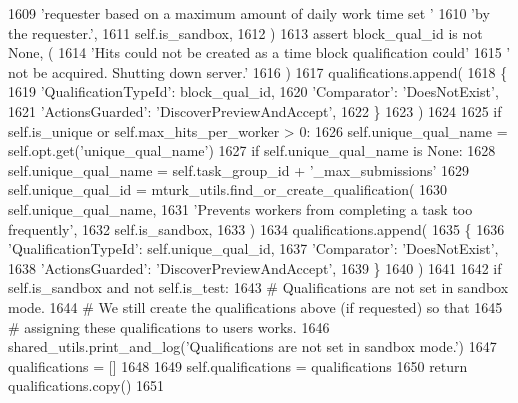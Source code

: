 \begin{DoxyCode}
1609                 \textcolor{stringliteral}{'requester based on a maximum amount of daily work time set '}
1610                 \textcolor{stringliteral}{'by the requester.'},
1611                 self.is\_sandbox,
1612             )
1613             \textcolor{keyword}{assert} block\_qual\_id \textcolor{keywordflow}{is} \textcolor{keywordflow}{not} \textcolor{keywordtype}{None}, (
1614                 \textcolor{stringliteral}{'Hits could not be created as a time block qualification could'}
1615                 \textcolor{stringliteral}{' not be acquired. Shutting down server.'}
1616             )
1617             qualifications.append(
1618                 \{
1619                     \textcolor{stringliteral}{'QualificationTypeId'}: block\_qual\_id,
1620                     \textcolor{stringliteral}{'Comparator'}: \textcolor{stringliteral}{'DoesNotExist'},
1621                     \textcolor{stringliteral}{'ActionsGuarded'}: \textcolor{stringliteral}{'DiscoverPreviewAndAccept'},
1622                 \}
1623             )
1624 
1625         \textcolor{keywordflow}{if} self.is\_unique \textcolor{keywordflow}{or} self.max\_hits\_per\_worker > 0:
1626             self.unique\_qual\_name = self.opt.get(\textcolor{stringliteral}{'unique\_qual\_name'})
1627             \textcolor{keywordflow}{if} self.unique\_qual\_name \textcolor{keywordflow}{is} \textcolor{keywordtype}{None}:
1628                 self.unique\_qual\_name = self.task\_group\_id + \textcolor{stringliteral}{'\_max\_submissions'}
1629             self.unique\_qual\_id = mturk\_utils.find\_or\_create\_qualification(
1630                 self.unique\_qual\_name,
1631                 \textcolor{stringliteral}{'Prevents workers from completing a task too frequently'},
1632                 self.is\_sandbox,
1633             )
1634             qualifications.append(
1635                 \{
1636                     \textcolor{stringliteral}{'QualificationTypeId'}: self.unique\_qual\_id,
1637                     \textcolor{stringliteral}{'Comparator'}: \textcolor{stringliteral}{'DoesNotExist'},
1638                     \textcolor{stringliteral}{'ActionsGuarded'}: \textcolor{stringliteral}{'DiscoverPreviewAndAccept'},
1639                 \}
1640             )
1641 
1642         \textcolor{keywordflow}{if} self.is\_sandbox \textcolor{keywordflow}{and} \textcolor{keywordflow}{not} self.is\_test:
1643             \textcolor{comment}{# Qualifications are not set in sandbox mode.}
1644             \textcolor{comment}{# We still create the qualifications above (if requested) so that}
1645             \textcolor{comment}{# assigning these qualifications to users works.}
1646             shared\_utils.print\_and\_log(\textcolor{stringliteral}{'Qualifications are not set in sandbox mode.'})
1647             qualifications = []
1648 
1649         self.qualifications = qualifications
1650         \textcolor{keywordflow}{return} qualifications.copy()
1651 
\end{DoxyCode}
